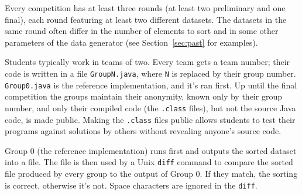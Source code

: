 \documentclass[12pt]{article}
\begin{document}
Every competition has at least three rounds (at least two preliminary and one final), each round featuring at least two different datasets. The datasets in the same round often differ in the number of elements to sort and in some other parameters of the data generator (see Section~\ref{sec:past} for examples). 

Students typically work in teams of two. Every team gets a team number; their code is written in a file \texttt{GroupN.java}, where \texttt{N} is replaced by their group number. 
\texttt{Group0.java} is the reference implementation, and it's ran first. 
Up until the final competition the groups maintain their anonymity, known only by their group number, and only their compiled code (the \texttt{.class} files), but not the source Java code, is made public. Making the \texttt{.class} files public allows students to test their programs against solutions by others without revealing anyone's source code. 

Group 0 (the reference implementation) runs first and outputs the sorted dataset into a file. The file is then used by a Unix \texttt{diff} command to compare the sorted file produced by every group to the output of Group 0. If they match, the sorting is correct, otherwise it's not. Space characters are ignored in the \texttt{diff}. 
\end{document}
